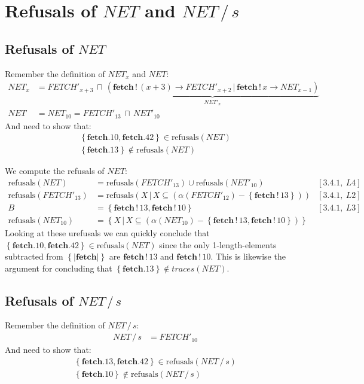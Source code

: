 \documentclass[11pt,a4paper]{article}
\def\ra{\rightarrow}
\def\ch{\,|\,}
\def\ic{\,\sqcap\,}
\def\wr{\,!\,}
\def\after{\,/\,}
\newcommand{\refusals}[1]{\text{refusals}\left ( #1 \right )}
\newcommand{\chan}[1]{\textbf{#1}}
\newcommand{\sN}[1]{\left \lbrace #1 \right \rbrace}
\newcommand{\abs}[1]{\left | #1 \right |}
\begin{document}
\section{Refusals of $NET$ and $NET \after s$}

\subsection{Refusals of $NET$}
Remember the definition of $NET_x$ and $NET$:
\begin{align*}
    NET_x &= FETCH'_{x+3} \ic
             \underbrace{(\chan{fetch} \wr (x+3) \ra FETCH'_{x+2} \ch
             \chan{fetch} \wr x \ra NET_{x-1})}_{NET'_x} \\
    NET &= NET_{10} = FETCH'_{13} \ic NET'_{10}
\end{align*}
And need to show that:
\begin{align*}
    \sN{\chan{fetch}.10, \chan{fetch}.42} \in \refusals{NET} \\
    \sN{\chan{fetch}.13} \not \in \refusals{NET}
\end{align*}

We compute the refusals of $NET$:
\begin{align*}
    \refusals{NET} &=
    \refusals{FETCH'_{13}} \cup \refusals{NET'_{10}} & [3.4.1,~L4] \\
    \refusals{FETCH'_{13}} &=
    \refusals{ X \ch X \subseteq (\alpha(FETCH'_{12}) - \sN{\chan{fetch}\wr 13}) }
        & [3.4.1,~L2] \\
    B &= \sN{\chan{fetch}\wr 13,\chan{fetch}\wr 10} & [3.4.1,~L3] \\
    \refusals{NET_{10}} &= \sN{ X \ch X \subseteq (\alpha(NET_{10}) - 
            \sN{\chan{fetch}\wr 13,\chan{fetch}\wr 10})}
\end{align*}
Looking at these urefusals we can quickly conclude that $\sN{\chan{fetch}.10,
\chan{fetch}.42} \in \refusals{NET}$ since the only 1-length-elements subtracted from
$\sN{\abs{\chan{fetch}}}$ are $\chan{fetch}\wr 13$ and $\chan{fetch}\wr 10$.
This is likewise the argument for concluding that $\sN{\chan{fetch}.13} \not \in
traces(NET)$.

\subsection{Refusals of $NET \after s$}
Remember the definition of $NET \after s$:
\begin{align*}
    NET \after s &= FETCH'_{10}
\end{align*}
And need to show that:
\begin{align*}
    \sN{\chan{fetch}.13, \chan{fetch}.42} \in \refusals{NET \after s} \\
    \sN{\chan{fetch}.10} \not \in \refusals{NET \after s}
\end{align*}
\end{document}
